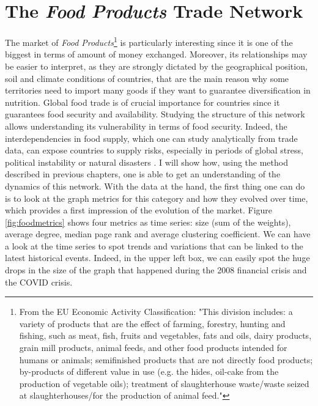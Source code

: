 \section{The \textit{Food Products} Trade Network}

The market of \textit{Food Products}\footnote{
    From the EU Economic Activity Classification:
    "This division includes: a variety of products that are the effect of farming, forestry, hunting and fishing, such as meat, fish, fruits and vegetables, fats and oils, dairy products, grain mill products, animal feeds, and other food products intended for humans or animals; semifinished products that are not directly food products; by-products of different value in use (e.g. the hides, oil-cake from the production of vegetable oils); treatment of slaughterhouse waste/waste seized at slaughterhouses/for the production of animal feed."\cite{eurostat2022website}
} is particularly interesting since it is one of the biggest in terms of amount of money exchanged. Moreover, its relationships may be easier to interpret, as they are strongly dictated by the geographical position, soil and climate conditions of countries, that are the main reason why some territories need to import many goods if they want to guarantee diversification in nutrition. Global food trade is of crucial importance for countries since it guarantees food security and availability. Studying the structure of this network allows understanding its vulnerability in terms of food security. Indeed, the interdependencies in food supply, which one can study analytically from trade data, can expose countries to supply risks, especially in periods of global stress, political instability or natural disasters \cite{wang2021evolution}. I will show how, using the method described in previous chapters, one is able to get an understanding of the dynamics of this network. With the data at the hand, the first thing one can do is to look at the graph metrics for this category and how they evolved over time, which provides a first impression of the evolution of the market. Figure \ref{fig:foodmetrics} shows four metrics as time series: size (sum of the weights), average degree, median page rank and average clustering coefficient. We can have a look at the time series to spot trends and variations that can be linked to the latest historical events. Indeed, in the upper left box, we can easily spot the huge drops in the size of the graph that happened during the 2008 financial crisis and the COVID crisis. 
